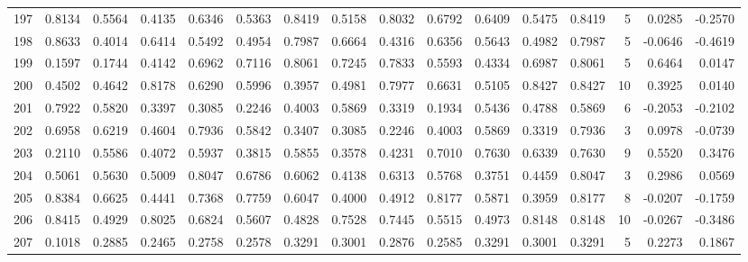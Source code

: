 \begin{tabular}{lrrrrrrrrrrrrrrr}
197 &      0.8134 &  0.5564 &  0.4135 &  0.6346 &  0.5363 &  0.8419 &  0.5158 &  0.8032 &  0.6792 &  0.6409 &   0.5475 &     0.8419 &      5 &                    0.0285 &                    -0.2570 \\
198 &      0.8633 &  0.4014 &  0.6414 &  0.5492 &  0.4954 &  0.7987 &  0.6664 &  0.4316 &  0.6356 &  0.5643 &   0.4982 &     0.7987 &      5 &                   -0.0646 &                    -0.4619 \\
199 &      0.1597 &  0.1744 &  0.4142 &  0.6962 &  0.7116 &  0.8061 &  0.7245 &  0.7833 &  0.5593 &  0.4334 &   0.6987 &     0.8061 &      5 &                    0.6464 &                     0.0147 \\
200 &      0.4502 &  0.4642 &  0.8178 &  0.6290 &  0.5996 &  0.3957 &  0.4981 &  0.7977 &  0.6631 &  0.5105 &   0.8427 &     0.8427 &     10 &                    0.3925 &                     0.0140 \\
201 &      0.7922 &  0.5820 &  0.3397 &  0.3085 &  0.2246 &  0.4003 &  0.5869 &  0.3319 &  0.1934 &  0.5436 &   0.4788 &     0.5869 &      6 &                   -0.2053 &                    -0.2102 \\
202 &      0.6958 &  0.6219 &  0.4604 &  0.7936 &  0.5842 &  0.3407 &  0.3085 &  0.2246 &  0.4003 &  0.5869 &   0.3319 &     0.7936 &      3 &                    0.0978 &                    -0.0739 \\
203 &      0.2110 &  0.5586 &  0.4072 &  0.5937 &  0.3815 &  0.5855 &  0.3578 &  0.4231 &  0.7010 &  0.7630 &   0.6339 &     0.7630 &      9 &                    0.5520 &                     0.3476 \\
204 &      0.5061 &  0.5630 &  0.5009 &  0.8047 &  0.6786 &  0.6062 &  0.4138 &  0.6313 &  0.5768 &  0.3751 &   0.4459 &     0.8047 &      3 &                    0.2986 &                     0.0569 \\
205 &      0.8384 &  0.6625 &  0.4441 &  0.7368 &  0.7759 &  0.6047 &  0.4000 &  0.4912 &  0.8177 &  0.5871 &   0.3959 &     0.8177 &      8 &                   -0.0207 &                    -0.1759 \\
206 &      0.8415 &  0.4929 &  0.8025 &  0.6824 &  0.5607 &  0.4828 &  0.7528 &  0.7445 &  0.5515 &  0.4973 &   0.8148 &     0.8148 &     10 &                   -0.0267 &                    -0.3486 \\
207 &      0.1018 &  0.2885 &  0.2465 &  0.2758 &  0.2578 &  0.3291 &  0.3001 &  0.2876 &  0.2585 &  0.3291 &   0.3001 &     0.3291 &      5 &                    0.2273 &                     0.1867 \\

\end{tabular}
